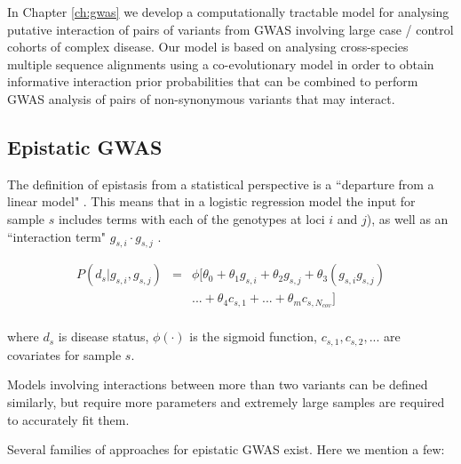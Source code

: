 In Chapter \ref{ch:gwas} we develop a computationally tractable model for analysing putative interaction of pairs of variants from GWAS involving large case / control cohorts of complex disease. Our model is based on analysing cross-species multiple sequence alignments using a co-evolutionary model in order to obtain informative interaction prior probabilities that can be combined to perform GWAS analysis of pairs of non-synonymous variants that may interact.

\subsection{Epistatic GWAS \label{sec:epigwas}}

The definition of epistasis from a statistical perspective is a ``departure from a linear model" \cite{cordell2009detecting}. This means that in a logistic regression model the input for sample $s$ includes terms with each of the genotypes at loci $i$ and $j$), as well as an ``interaction term" $g_{s,i} \cdot g_{s,j}$ \cite{cordell2002epistasis}. 

\begin{eqnarray*} \label{eq:gwasLogRegH1}
    P( d_s | g_{s,i},g_{s,j}) & = & \phi[ \theta_0 + \theta_1 g_{s,i} + \theta_2 g_{s,j} + \theta_3 (g_{s,i} g_{s,j}) \\
    & & ... + \theta_4 c_{s,1} + ... + \theta_m c_{s,N_{cov}} ] \\
\end{eqnarray*}

where $d_s$ is disease status, $\phi(\cdot)$ is the sigmoid function, $c_{s,1}, c_{s,2}, ... $ are covariates for sample $s$.

Models involving interactions between more than two variants can be defined similarly, but require more parameters and extremely large samples are required to accurately fit them.

Several families of approaches for epistatic GWAS exist. Here we mention a few:

